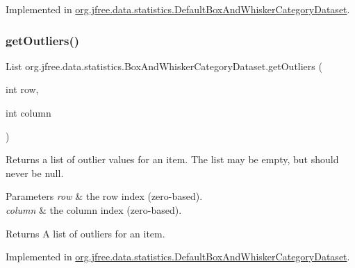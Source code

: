 Implemented in \mbox{\hyperlink{classorg_1_1jfree_1_1data_1_1statistics_1_1_default_box_and_whisker_category_dataset_a8280fd48bbb2161d62cf90473f46eac8}{org.\+jfree.\+data.\+statistics.\+Default\+Box\+And\+Whisker\+Category\+Dataset}}.

\mbox{\label{interfaceorg_1_1jfree_1_1data_1_1statistics_1_1_box_and_whisker_category_dataset_a8daae035046e9f8a98ceda14d3f5d3d5}} 
\subsubsection{\texorpdfstring{get\+Outliers()}{getOutliers()}\hspace{0.1cm}{\footnotesize\ttfamily [1/2]}}
{\footnotesize\ttfamily List org.\+jfree.\+data.\+statistics.\+Box\+And\+Whisker\+Category\+Dataset.\+get\+Outliers (\begin{DoxyParamCaption}\item[{int}]{row,  }\item[{int}]{column }\end{DoxyParamCaption})}

Returns a list of outlier values for an item. The list may be empty, but should never be {\ttfamily null}.


\begin{DoxyParams}{Parameters}
{\em row} & the row index (zero-\/based). \\
\hline
{\em column} & the column index (zero-\/based).\\
\hline
\end{DoxyParams}
\begin{DoxyReturn}{Returns}
A list of outliers for an item. 
\end{DoxyReturn}


Implemented in \mbox{\hyperlink{classorg_1_1jfree_1_1data_1_1statistics_1_1_default_box_and_whisker_category_dataset_a25d77e5239cf4b5619fbdca15ef65152}{org.\+jfree.\+data.\+statistics.\+Default\+Box\+And\+Whisker\+Category\+Dataset}}.

\mbox{\label{interfaceorg_1_1jfree_1_1data_1_1statistics_1_1_box_and_whisker_category_dataset_a42643c81a2ac6cf5643c87e01b2120c3}} 
